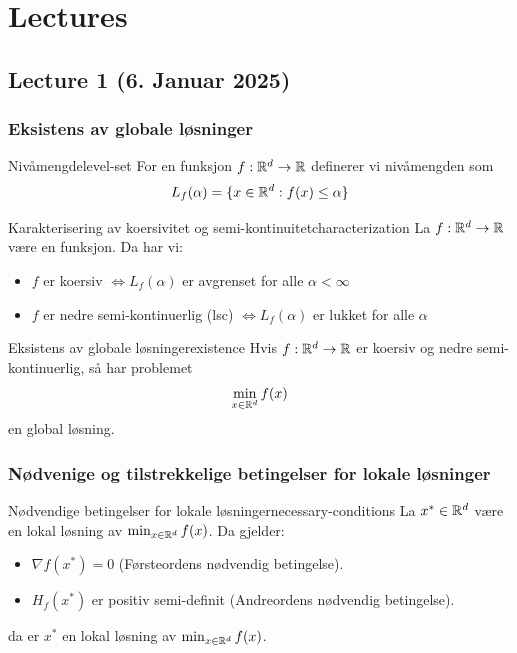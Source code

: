 \chapter{Lectures}
\clearpage

\section{Lecture 1 (6. Januar 2025)}

\subsection*{Eksistens av globale løsninger}

\begin{definition}{Nivåmengde}{level-set}
  For en funksjon  \(f: \mathbb{R}^d \to \mathbb{R}\) definerer vi nivåmengden som
  \[
    L_f(\alpha) = \{x \in \mathbb{R}^d : f(x) \leq \alpha\}
  \]
\end{definition}

\begin{theorem}{Karakterisering av koersivitet og semi-kontinuitet}{characterization}
  La  \(f: \mathbb{R}^d \to \mathbb{R}\) være en funksjon. Da har vi:
  \begin{itemize}
    \item  \(f\) er koersiv  \(\iff L_f(\alpha)\) er avgrenset for alle  \(\alpha < \infty\)
    \item  \(f\) er nedre semi-kontinuerlig (lsc)  \(\iff L_f(\alpha)\) er lukket for alle  \(\alpha\)
  \end{itemize}
\end{theorem}

\begin{theorem}{Eksistens av globale løsninger}{existence}
  Hvis  \(f: \mathbb{R}^d \to \mathbb{R}\) er koersiv og nedre semi-kontinuerlig, så har problemet
  \[
    \min_{x \in \mathbb{R}^d} f(x)
  \]
  en global løsning.
\end{theorem}

\subsection*{Nødvenige og tilstrekkelige betingelser for lokale løsninger}

\begin{theorem}{Nødvendige betingelser for lokale løsninger}{necessary-conditions}
  La  \(x^* \in \mathbb{R}^d\) være en lokal løsning av  \(\min_{x \in \mathbb{R}^d} f(x)\). Da gjelder:
  \begin{itemize}
    \item  \(\nabla f(x^*) = 0\) (Førsteordens nødvendig betingelse).
    \item  \(H_f(x^*)\) er positiv semi-definit (Andreordens nødvendig betingelse).
  \end{itemize}
  da er \(x^*\) en lokal løsning av  \(\min_{x \in \mathbb{R}^d} f(x)\).
\end{theorem}

